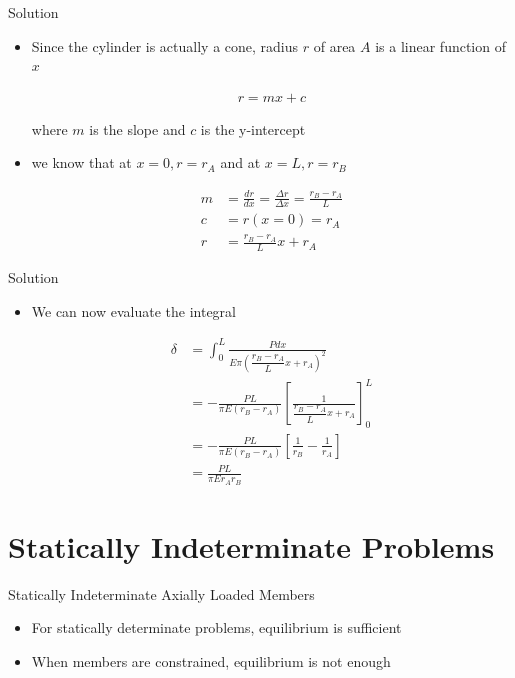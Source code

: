 \documentclass[10pt, svgnames]{beamer}
\begin{document}
\begin{frame}[label={sec:org6330637}]{Solution}
\begin{itemize}
\item Since the cylinder is actually a cone, radius \(r\) of area \(A\) is a linear function of \(x\)

\begin{align*}
  r = mx + c
\end{align*}

where \(m\) is the slope and \(c\) is the y-intercept

\item we know that at \(x = 0, r = r_{A}\) and at \(x = L, r = r_{B}\)

\begin{align*}
  m &= \frac{dr}{dx} = \frac{\Delta r}{\Delta x} = \frac{r_{B} - r_{A}}{L} \\
  c &= r(x = 0) = r_{A} \\
  r &=  \frac{r_{B} - r_{A}}{L} x + r_{A}
\end{align*}
\end{itemize}
\end{frame}

\begin{frame}[label={sec:orga6d93ba}]{Solution}
\begin{itemize}
\item We can now evaluate the integral

\begin{align*}
  \delta &= \int_{0}^{L} \frac{Pdx}{E \pi \left( \dfrac{r_{B} - r_{A}}{L} x + r_{A} \right)^{2}} \\
         &= - \frac{PL}{\pi E \left( r_{B} - r_{A}  \right)} \left[ \frac{1}{ \dfrac{ r_{B} - r_{A} }{L} x + r_{A} } \right]_{0}^{L} \\
         &= - \frac{PL}{\pi E \left( r_{B} - r_{A}  \right)} \left[ \frac{1}{r_{B}} - \frac{1}{r_{A}} \right] \\
         &= \frac{PL}{\pi E r_{A} r_{B}}
\end{align*}
\end{itemize}
\end{frame}

\section{Statically Indeterminate Problems}
\label{statically-indeterminate-problems}
\begin{frame}[label={sec:org3a7942c}]{Statically Indeterminate Axially Loaded Members}
\begin{itemize}
\item For statically determinate problems, equilibrium is sufficient

\item When members are constrained, equilibrium is not enough
\end{itemize}
\end{frame}
\end{document}
